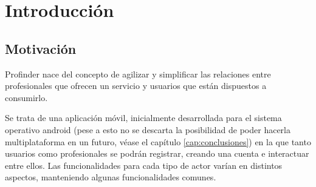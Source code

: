 \chapter{Introducción}
\label{cap:introduccion}


\section{Motivación}
Profinder nace del concepto de agilizar y simplificar las relaciones entre profesionales que ofrecen un servicio y usuarios que están dispuestos a consumirlo.

Se trata de una aplicación móvil, inicialmente desarrollada 
para el sistema operativo android (pese a esto no se descarta la posibilidad de poder hacerla multiplataforma en un futuro, véase el capítulo \ref{cap:conclusiones}) en la que tanto usuarios como profesionales se podrán registrar, creando una cuenta e interactuar entre ellos. Las funcionalidades para cada tipo de actor varían en distintos aspectos, manteniendo algunas funcionalidades comunes.  

